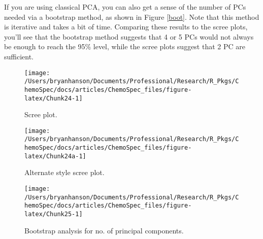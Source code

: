 \documentclass[letter,10pt,twocolumn,twoside,printwatermark=false]{pinp}
\begin{document}
If you are using classical PCA, you can also get a sense of the number
of PCs needed via a bootstrap method, as shown in Figure \ref{boot}.
Note that this method is iterative and takes a bit of time. Comparing
these results to the scree plots, you'll see that the bootstrap method
suggests that 4 or 5 PCs would not always be enough to reach the 95\%
level, while the scree plots suggest that 2 PC are sufficient.

\begin{Shaded}
\begin{Highlighting}[]
\end{Highlighting}
\end{Shaded}

\begin{figure}

{\centering \texttt{[image: /Users/bryanhanson/Documents/Professional/Research/R\_Pkgs/ChemoSpec/docs/articles/ChemoSpec\_files/figure-latex/Chunk24-1]} 

}

\caption{\label{scree}Scree plot.}\label{fig:Chunk24}
\end{figure}

\begin{Shaded}
\begin{Highlighting}[]
\end{Highlighting}
\end{Shaded}

\begin{figure}

{\centering \texttt{[image: /Users/bryanhanson/Documents/Professional/Research/R\_Pkgs/ChemoSpec/docs/articles/ChemoSpec\_files/figure-latex/Chunk24a-1]} 

}

\caption{\label{scree2}Alternate style scree plot.}\label{fig:Chunk24a}
\end{figure}

\begin{Shaded}
\begin{Highlighting}[]
\StringTok{ }
   \NormalTok{)}
\end{Highlighting}
\end{Shaded}

\begin{figure}

{\centering \texttt{[image: /Users/bryanhanson/Documents/Professional/Research/R\_Pkgs/ChemoSpec/docs/articles/ChemoSpec\_files/figure-latex/Chunk25-1]} 

}

\caption{\label{boot}Bootstrap analysis for no. of principal components.}\label{fig:Chunk25}
\end{figure}
\end{document}
